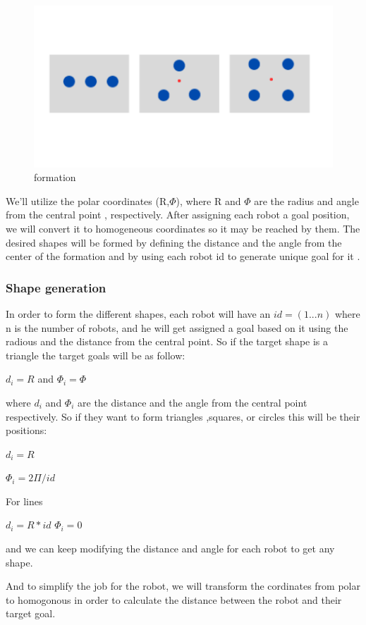 \documentclass[12pt]{article}
\begin{document}
 
 \begin{figure}[h]  
\centering
\includegraphics[scale=0.4]{formation}
\caption[formation]{formation}
\end{figure}

We'll utilize the polar coordinates (R,$\Phi$), where R and $\Phi$ are the radius and angle from the central point , respectively. After assigning each robot a goal position, we will convert it to homogeneous coordinates so  it may be reached  by them. The desired shapes will be formed by defining the distance and the angle  from the center of the formation and by using each robot id to generate unique goal for it .
\pagebreak
\subsubsection{Shape generation}

In order to form the different shapes, each robot will have an $id=(1...n)$ 
where n is the number of robots, and he will get assigned a goal based on it
using the radious and the distance from the central point. So if the target shape is a triangle the target goals will be as follow:

           $d_{i}=R$ and 
           $\Phi_{i}=\Phi$

where $d_{i}$ and  $\Phi_{i}$ are the distance and the angle from the central point respectively. So if they want to form triangles ,squares, or circles this will be their positions:


 			$d_{i}=R$

			$\Phi_{i}=2\Pi/id$

For lines

$d_{i}=R*id$
$\Phi_{i}=0$

and we can keep modifying the distance and angle for each robot to get any shape.

And to simplify the job for the robot, we will transform the cordinates from polar to homogonous in order to calculate the distance between the robot and their target goal. 
\end{document}
